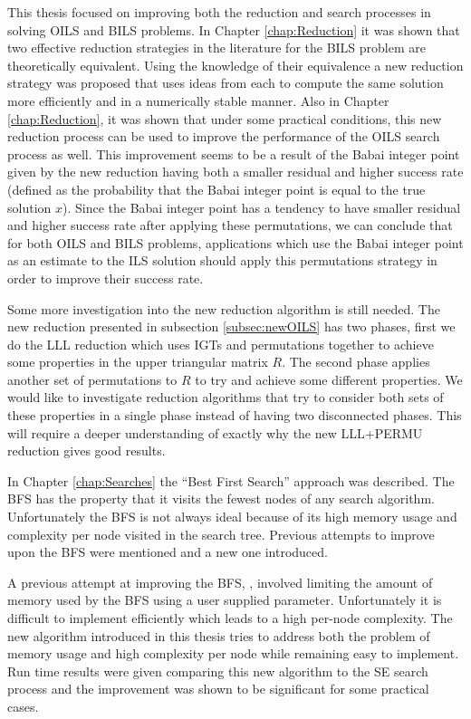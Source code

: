 \documentclass[12pt,Bold,letterpaper]{mcgilletdclass}
\begin{document}
This thesis focused on improving both the reduction and search processes in solving OILS and BILS problems. In Chapter \ref{chap:Reduction} it was shown that two effective reduction strategies in the literature for the BILS problem are theoretically equivalent. Using the knowledge of their equivalence a new reduction strategy was proposed that uses ideas from each to compute the same solution more efficiently and in a numerically stable manner. Also in Chapter \ref{chap:Reduction}, it was shown that under some practical conditions, this new reduction process can be used to improve the performance of the OILS search process as well. This improvement seems to be a result of the Babai integer point given by the new reduction having both a smaller residual and higher success rate (defined as the probability that the Babai integer point is equal to the true solution $x$). Since the Babai integer point has a tendency to have smaller residual and higher success rate after applying these permutations, we can conclude that for both OILS and BILS problems, applications which use the Babai integer point as an estimate to the ILS solution should apply this permutations strategy in order to improve their success rate.

Some more investigation into the new reduction algorithm is still needed. The new reduction presented in subsection \ref{subsec:newOILS} has two phases, first we do the LLL reduction which uses IGTs and permutations together to achieve some properties in the upper triangular matrix $R$. The second phase applies another set of permutations to $R$ to try and achieve some different properties. We would like to investigate reduction algorithms that try to consider both sets of these properties in a single phase instead of having two disconnected phases. This will require a deeper understanding of exactly why the new LLL+PERMU reduction gives good results.

In Chapter \ref{chap:Searches} the ``Best First Search'' approach was described. The BFS has the property that it visits the fewest nodes of any search algorithm. Unfortunately the BFS is not always ideal because of its high memory usage and complexity per node visited in the search tree. Previous attempts to improve upon the BFS were mentioned and a new one introduced. 

A previous attempt at improving the BFS, \cite{StuBF07}, involved limiting the amount of memory used by the BFS using a user supplied parameter. Unfortunately it is difficult to implement efficiently which leads to a high per-node complexity. The new algorithm introduced in this thesis tries to address both the problem of memory usage and high complexity per node while remaining easy to implement. Run time results were given comparing this new algorithm to the SE search process and the improvement was shown to be significant for some practical cases. 
\end{document}
